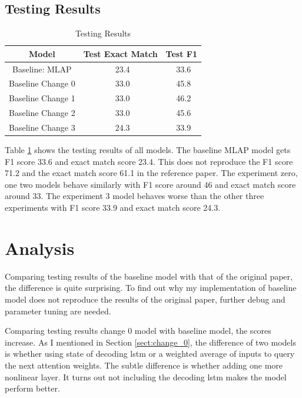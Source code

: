 \documentclass[modernstyle,12pt]{sjsuthesis}
\theoremstyle{definition}
\begin{document}
\subsection{Testing Results}

\begin{table}[htbp]\centering
  \caption{Testing Results}
  \label{tab:test_results}
  \begin{tabular}{|c|c|c|}
    \hline
    Model& Test Exact Match & Test F1 \\
    \hline\hline
    Baseline: MLAP & \ 23.4 &\ 33.6 \\
    Baseline Change 0& \ 33.0 &\ 45.8 \\
    Baseline Change 1 & \ 33.0 &\ 46.2 \\
    Baseline Change 2 & \ 33.0 &\ 45.6 \\
    Baseline Change 3 & \ 24.3 &\ 33.9 \\
    \hline
  \end{tabular}
\end{table}

Table \ref{tab:test_results} shows the testing results of all models. The baseline MLAP model gets F1 score 33.6 and exact match score 23.4. This does not reproduce the F1 score 71.2 and the exact match score 61.1 in the reference paper\cite{wang2016machine}. The experiment zero, one two models behave similarly with F1 score around 46 and exact match score around 33. The experiment 3 model behaves worse than the other three experiments with F1 score 33.9 and exact match score 24.3.




\section{Analysis}

Comparing testing results of the baseline model with that of the original paper, the difference is quite surprising. To find out why my implementation of baseline model does not reproduce the results of the original paper, further debug and parameter tuning are needed.

Comparing testing results change 0 model with baseline model, the scores increase. As I mentioned in Section \ref{sect:change_0}, the difference of two models is whether using state of decoding lstm or a weighted average of inputs to query the next attention weights. The subtle difference is whether adding one more nonlinear layer. It turns out not including the decoding lstm makes the model perform better.
\end{document}
